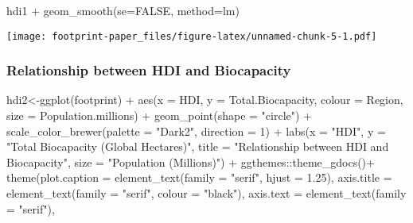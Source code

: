 \documentclass[
]{article}
\newenvironment{Shaded}{\begin{snugshade}}{\end{snugshade}}
\newcommand{\AttributeTok}[1]{\textcolor[rgb]{0.77,0.63,0.00}{#1}}
\newcommand{\ConstantTok}[1]{\textcolor[rgb]{0.00,0.00,0.00}{#1}}
\newcommand{\DecValTok}[1]{\textcolor[rgb]{0.00,0.00,0.81}{#1}}
\newcommand{\FloatTok}[1]{\textcolor[rgb]{0.00,0.00,0.81}{#1}}
\newcommand{\FunctionTok}[1]{\textcolor[rgb]{0.00,0.00,0.00}{#1}}
\newcommand{\NormalTok}[1]{#1}
\newcommand{\OtherTok}[1]{\textcolor[rgb]{0.56,0.35,0.01}{#1}}
\newcommand{\SpecialCharTok}[1]{\textcolor[rgb]{0.00,0.00,0.00}{#1}}
\newcommand{\StringTok}[1]{\textcolor[rgb]{0.31,0.60,0.02}{#1}}
\begin{document}
\begin{Shaded}
\begin{Highlighting}[]
\NormalTok{hdi1 }\SpecialCharTok{+} \FunctionTok{geom\_smooth}\NormalTok{(}\AttributeTok{se=}\ConstantTok{FALSE}\NormalTok{, }\AttributeTok{method=}\NormalTok{lm)}
\end{Highlighting}
\end{Shaded}

\texttt{[image: footprint-paper\_files/figure-latex/unnamed-chunk-5-1.pdf]}

\hypertarget{relationship-between-hdi-and-biocapacity}{%
\subsubsection{Relationship between HDI and
Biocapacity}\label{relationship-between-hdi-and-biocapacity}}

\begin{Shaded}
\begin{Highlighting}[]
\NormalTok{hdi2}\OtherTok{\textless{}{-}}\FunctionTok{ggplot}\NormalTok{(footprint) }\SpecialCharTok{+}
  \FunctionTok{aes}\NormalTok{(}\AttributeTok{x =}\NormalTok{ HDI, }\AttributeTok{y =}\NormalTok{ Total.Biocapacity, }\AttributeTok{colour =}\NormalTok{ Region, }\AttributeTok{size =}\NormalTok{ Population.millions) }\SpecialCharTok{+}
  \FunctionTok{geom\_point}\NormalTok{(}\AttributeTok{shape =} \StringTok{"circle"}\NormalTok{) }\SpecialCharTok{+}
  \FunctionTok{scale\_color\_brewer}\NormalTok{(}\AttributeTok{palette =} \StringTok{"Dark2"}\NormalTok{, }\AttributeTok{direction =} \DecValTok{1}\NormalTok{) }\SpecialCharTok{+}
  \FunctionTok{labs}\NormalTok{(}\AttributeTok{x =} \StringTok{"HDI"}\NormalTok{, }
       \AttributeTok{y =} \StringTok{"Total Biocapacity (Global Hectares)"}\NormalTok{, }\AttributeTok{title =} \StringTok{"Relationship between HDI and Biocapacity"}\NormalTok{, }
       \AttributeTok{size =} \StringTok{"Population (Millions)"}\NormalTok{) }\SpecialCharTok{+}
\NormalTok{  ggthemes}\SpecialCharTok{::}\FunctionTok{theme\_gdocs}\NormalTok{()}\SpecialCharTok{+} \FunctionTok{theme}\NormalTok{(}\AttributeTok{plot.caption =} \FunctionTok{element\_text}\NormalTok{(}\AttributeTok{family =} \StringTok{"serif"}\NormalTok{,}
                                                             \AttributeTok{hjust =} \FloatTok{1.25}\NormalTok{), }\AttributeTok{axis.title =} \FunctionTok{element\_text}\NormalTok{(}\AttributeTok{family =} \StringTok{"serif"}\NormalTok{,}
                                                                                                      \AttributeTok{colour =} \StringTok{"black"}\NormalTok{), }\AttributeTok{axis.text =} \FunctionTok{element\_text}\NormalTok{(}\AttributeTok{family =} \StringTok{"serif"}\NormalTok{),}

\end{Highlighting}
\end{Shaded}
\end{document}

